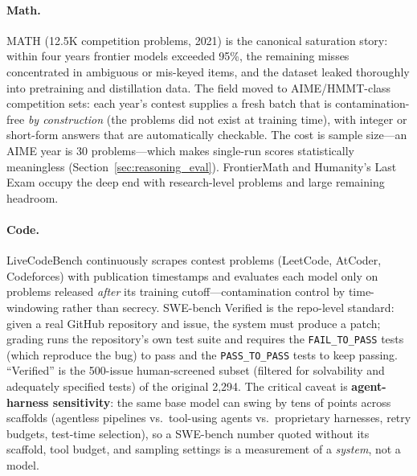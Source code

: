 \paragraph{Math.}
MATH (12.5K competition problems, 2021) is the canonical saturation story:
within four years frontier models exceeded 95\%, the remaining misses
concentrated in ambiguous or mis-keyed items, and the dataset leaked
thoroughly into pretraining and distillation data.  The field moved to
AIME/HMMT-class competition sets: each year's contest supplies a fresh batch
that is contamination-free \emph{by construction} (the problems did not exist
at training time), with integer or short-form answers that are automatically
checkable.  The cost is sample size---an AIME year is 30 problems---which
makes single-run scores statistically meaningless
(Section~\ref{sec:reasoning_eval}).  FrontierMath and Humanity's Last Exam
occupy the deep end with research-level problems and large remaining headroom.

\paragraph{Code.}
LiveCodeBench continuously scrapes contest problems (LeetCode, AtCoder,
Codeforces) with publication timestamps and evaluates each model only on
problems released \emph{after} its training cutoff---contamination control by
time-windowing rather than secrecy.  SWE-bench Verified is the repo-level
standard: given a real GitHub repository and issue, the system must produce a
patch; grading runs the repository's own test suite and requires the
\texttt{FAIL\_TO\_PASS} tests (which reproduce the bug) to pass and the
\texttt{PASS\_TO\_PASS} tests to keep passing.  ``Verified'' is the 500-issue
human-screened subset (filtered for solvability and adequately specified
tests) of the original 2{,}294.  The critical caveat is
\textbf{agent-harness sensitivity}: the same base model can swing by tens of
points across scaffolds (agentless pipelines vs.\ tool-using agents vs.\
proprietary harnesses, retry budgets, test-time selection), so a SWE-bench
number quoted without its scaffold, tool budget, and sampling settings is a
measurement of a \emph{system}, not a model.

